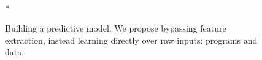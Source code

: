 \begin{figure}[t!]
  \centering
  \\*%
  \vspace{-.4em}%
  \caption{%
    Building a predictive model. We propose bypassing feature extraction, instead learning directly over raw inputs: programs and data.%
  }%
  \label{fig:overview}
\end{figure}
